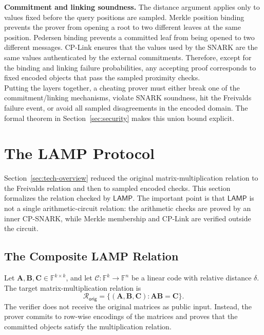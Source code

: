 \documentclass[conference,compsoc]{IEEEtran}
\newcommand{\mat}{\mathbf}          %
\newcommand{\protocol}{\textsf{LAMP}}   %
\theoremstyle{plain}
\theoremstyle{definition}
\theoremstyle{remark}
\begin{document}
\noindent\textbf{Commitment and linking soundness.}
The distance argument applies only to values fixed before the query positions
are sampled.  Merkle position binding prevents the prover from opening a root
to two different leaves at the same position.  Pedersen binding prevents a
committed leaf from being opened to two different messages.  CP-Link ensures
that the values used by the SNARK are the same values authenticated by the
external commitments.  Therefore, except for the binding and linking failure
probabilities, any accepting proof corresponds to fixed encoded objects that
pass the sampled proximity checks. \\

Putting the layers together, a cheating prover must either break one of the
commitment/linking mechanisms, violate SNARK soundness, hit the Freivalds
failure event, or avoid all sampled disagreements in the encoded domain.  The
formal theorem in Section~\ref{sec:security} makes this union bound explicit.




\section{The LAMP Protocol}
\label{sec:construction}

Section~\ref{sec:tech-overview} reduced the original matrix-multiplication
relation to the Freivalds relation and then to sampled encoded checks.  This
section formalizes the relation checked by \(\protocol\).  The important point is
that \(\protocol\) is not a single arithmetic-circuit relation: the arithmetic
checks are proved by an inner CP-SNARK, while Merkle membership and CP-Link are
verified outside the circuit.

\subsection{The Composite LAMP Relation}
\label{sec:relation-chain}

Let \(\mat{A},\mat{B},\mat{C}\in\mathbb{F}^{k\times k}\), and let
\(\mathcal{C}:\mathbb{F}^k\to\mathbb{F}^n\) be a linear code with
relative distance \(\delta\).  The target matrix-multiplication relation is
\[
  \mathcal{R}_{\mathsf{orig}}
  =
  \{(\mat{A},\mat{B},\mat{C}) :
    \mat{A}\mat{B}=\mat{C}\}.
\]
The verifier does not receive the original matrices as public input.  Instead, the
prover commits to row-wise encodings of the matrices and proves that the
committed objects satisfy the multiplication relation.
\end{document}
